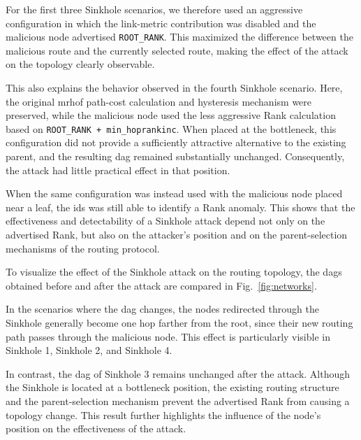 For the first three Sinkhole scenarios, we therefore used an aggressive configuration in which the link-metric contribution was disabled and the malicious node advertised \texttt{ROOT\_RANK}.
This maximized the difference between the malicious route and the currently selected route, making the effect of the attack on the topology clearly observable.

This also explains the behavior observed in the fourth Sinkhole scenario.
Here, the original \gls{mrhof} path-cost calculation and hysteresis mechanism were preserved, while the malicious node used the less aggressive Rank calculation based on \texttt{ROOT\_RANK + min\_hoprankinc}.
When placed at the bottleneck, this configuration did not provide a sufficiently attractive alternative to the existing parent, and the resulting \gls{dag} remained substantially unchanged.
Consequently, the attack had little practical effect in that position.

When the same configuration was instead used with the malicious node placed near a leaf, the \gls{ids} was still able to identify a Rank anomaly.
This shows that the effectiveness and detectability of a Sinkhole attack depend not only on the advertised Rank, but also on the attacker's position and on the parent-selection mechanisms of the routing protocol.

To visualize the effect of the Sinkhole attack on the routing topology, the \glspl{dag} obtained before and after the attack are compared in Fig.~\ref{fig:networks}.

In the scenarios where the \gls{dag} changes, the nodes redirected through the Sinkhole generally become one hop farther from the root, since their new routing path passes through the malicious node. 
This effect is particularly visible in Sinkhole 1, Sinkhole 2, and Sinkhole 4.

In contrast, the \gls{dag} of Sinkhole 3 remains unchanged after the attack. 
Although the Sinkhole is located at a bottleneck position, the existing routing structure and the parent-selection mechanism prevent the advertised Rank from causing a topology change. 
This result further highlights the influence of the node's position on the effectiveness of the attack.

